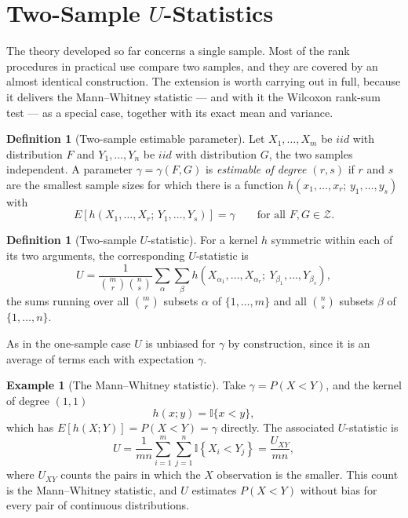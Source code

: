 \documentclass[12pt,a4paper]{report}
\theoremstyle{definition}
\newtheorem{defn}[thm]{Definition}
\newtheorem{exa}[thm]{Example}
\theoremstyle{plain}
\begin{document}
\section{Two-Sample $U$-Statistics}

The theory developed so far concerns a single sample. Most of the rank
procedures in practical use compare two samples, and they are covered by an
almost identical construction. The extension is worth carrying out in full,
because it delivers the Mann--Whitney statistic --- and with it the Wilcoxon
rank-sum test --- as a special case, together with its exact mean and variance.

\begin{defn}[Two-sample estimable parameter]
Let $X_1,\dots,X_m$ be $iid$ with distribution $F$ and $Y_1,\dots,Y_n$ be $iid$
with distribution $G$, the two samples independent. A parameter
$\gamma = \gamma(F,G)$ is \emph{estimable of degree $(r,s)$} if $r$ and $s$ are
the smallest sample sizes for which there is a function
$h(x_1,\dots,x_r;\,y_1,\dots,y_s)$ with
$$E\left[h(X_1,\dots,X_r;\,Y_1,\dots,Y_s)\right] = \gamma
\qquad\text{for all } F,G\in\mathscr{Z}.$$
\end{defn}

\begin{defn}[Two-sample $U$-statistic]
For a kernel $h$ symmetric within each of its two arguments, the corresponding
$U$-statistic is
$$U = \frac{1}{\binom{m}{r}\binom{n}{s}}
\sum_{\alpha}\sum_{\beta}
h\left(X_{\alpha_1},\dots,X_{\alpha_r};\ Y_{\beta_1},\dots,Y_{\beta_s}\right),$$
the sums running over all $\binom{m}{r}$ subsets $\alpha$ of $\{1,\dots,m\}$
and all $\binom{n}{s}$ subsets $\beta$ of $\{1,\dots,n\}$.
\end{defn}

As in the one-sample case $U$ is unbiased for $\gamma$ by construction, since it
is an average of terms each with expectation $\gamma$.

\begin{exa}[The Mann--Whitney statistic]
\label{exa:mw}
Take $\gamma = P(X<Y)$, and the kernel of degree $(1,1)$
$$h(x;y) = \mathbb{I}\{x<y\},$$
which has $E\left[h(X;Y)\right] = P(X<Y) = \gamma$ directly. The associated
$U$-statistic is
$$U = \frac{1}{mn}\sum^{m}_{i=1}\sum^{n}_{j=1}\mathbb{I}\left\{X_i<Y_j\right\}
= \frac{U_{XY}}{mn},$$
where $U_{XY}$ counts the pairs in which the $X$ observation is the smaller.
This count is the Mann--Whitney statistic, and $U$ estimates $P(X<Y)$ without
bias for every pair of continuous distributions.
\end{exa}
\end{document}
